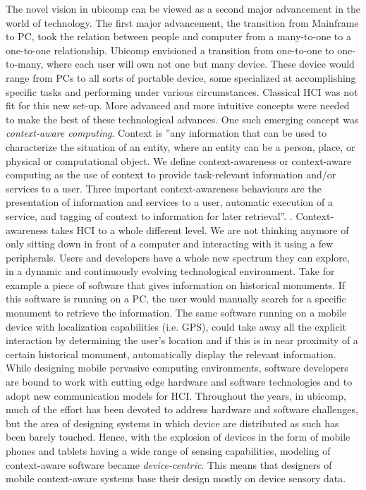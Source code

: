 The novel vision in ubicomp can be viewed as a second major advancement in the world of technology. The first major advancement, the transition from Mainframe to PC, took the relation between people and computer from a many-to-one to a one-to-one relationship. Ubicomp envisioned a transition from one-to-one to one-to-many, where each user will own not one but many device. These device would range from PCs to all sorts of portable device, some specialized at accomplishing specific tasks and performing under various circumstances. Classical HCI was not fit for this new set-up. More advanced and more intuitive concepts were needed to make the best of these technological advances. One such emerging concept was \emph{context-aware computing}. Context is ''any information that can be used to characterize the situation of an entity, where an entity can be a person, place, or physical or computational object. We define context-awareness or context-aware computing as the use of context to provide task-relevant information and/or services to a user. Three important context-awareness behaviours are the presentation of information and services to a user, automatic execution of a service, and tagging of context to information for later retrieval''. \cite{abowd1999towards}. Context-awareness takes HCI to a whole different level. We are not thinking anymore of only sitting down in front of a computer and interacting with it using a few peripherals. Users and developers have a whole new spectrum they can explore, in a dynamic and continuously evolving technological environment. Take for example a piece of software that gives information on historical monuments. If this software is running on a PC, the user would manually search for a specific monument to retrieve the information. The same software running on a mobile device with localization capabilities (i.e. GPS), could take away all the explicit interaction by determining the user's location and if this is in near proximity of a certain historical monument, automatically display the relevant information.\\

While designing mobile pervasive computing environments, software developers are bound to work with cutting edge hardware and software technologies and to adopt new communication models for HCI. Throughout the years, in ubicomp, much of the effort has been devoted to address hardware and software challenges, but the area of designing systems in which device are distributed as such has been barely touched. Hence, with the explosion of devices in the form of mobile phones and tablets having a wide range of sensing capabilities, modeling of context-aware software became \emph{device-centric}. This means that designers of mobile context-aware systems base their design mostly on device sensory data.\\

